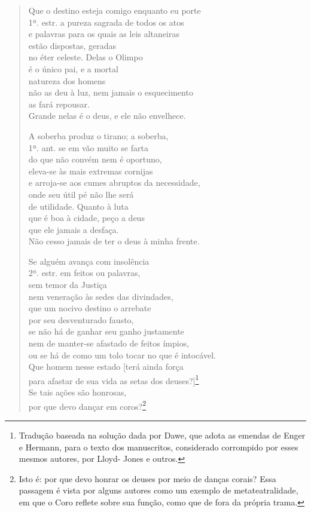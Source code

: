 \begin{verse}Que o destino esteja comigo enquanto eu porte\\ 1ª. estr.
a pureza sagrada de todos os atos\\
e palavras para os quais as leis altaneiras\\
estão dispostas, geradas\\
no éter celeste. Delas o Olimpo\\
é o único pai, e a mortal\\
natureza dos homens\\
não as deu à luz, nem jamais o esquecimento \\
as fará repousar.\\
Grande nelas é o deus, e ele não envelhece.

A soberba produz o tirano; a soberba,\\ 1ª. ant.
se em vão muito se farta\\
do que não convém nem é oportuno,\\
eleva-se às mais extremas cornijas\\
e arroja-se aos cumes abruptos da necessidade,\\
onde seu útil pé não lhe será\\
de utilidade. Quanto à luta\\
que é boa à cidade, peço a deus \\
que ele jamais a desfaça.\\
Não cesso jamais de ter o deus à minha frente.

Se alguém avança com insolência\\ 2ª. estr.
em feitos ou palavras,\\
sem temor da Justiça\\
nem veneração às sedes das divindades,\\
que um nocivo destino o arrebate\\
por seu desventurado fausto,\\
se não há de ganhar seu ganho justamente\\
nem de manter-se afastado de feitos ímpios, \\
ou se há de como um tolo tocar no que é intocável.\\
Que homem nesse estado {[}terá ainda força\\
para afastar de sua vida as setas dos deuses?{]}\footnote{Tradução
baseada na solução dada por Dawe, que adota as emendas de Enger e
Hermann, para o texto dos manuscritos, considerado corrompido por
esses mesmos autores, por Lloyd- Jones e outros.}\\
Se tais ações são honrosas,\\
por que devo dançar em coros?\footnote{Isto é: por que devo honrar os
  deuses por meio de danças corais? Essa passagem é vista por alguns
  autores como um exemplo de metateatralidade, em que o Coro reflete
  sobre sua função, como que de fora da própria trama.}


\end{verse}
